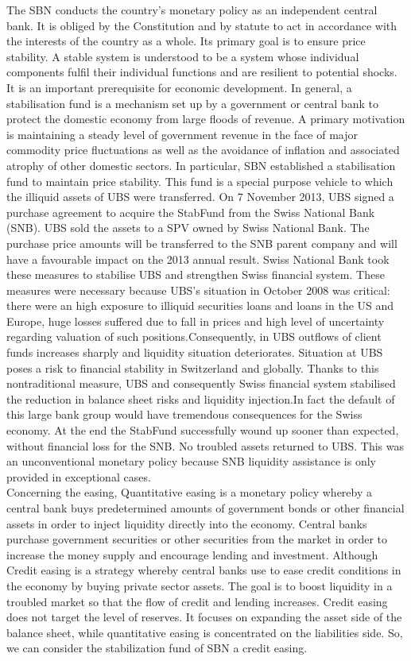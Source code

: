 \documentclass[	11pt, ]{fphw}
\begin{document}
The SBN conducts the country’s monetary policy as an independent central bank. It is obliged by the Constitution and by statute to act in accordance with the interests of the country as a whole. Its primary goal is to ensure price stability. A stable system is understood to be a system whose individual components fulfil their individual functions and are resilient to potential shocks. It is an important prerequisite for economic development.
In general, a stabilisation fund is a mechanism set up by a government or central bank to protect the domestic economy from large floods of revenue. A primary motivation is maintaining a steady level of government revenue in the face of major commodity price fluctuations as well as the avoidance of inflation and associated atrophy of other domestic sectors. 
In particular, SBN established a stabilisation fund to maintain price stability. This fund is a special purpose vehicle to which the illiquid assets of UBS were transferred. On 7 November 2013, UBS signed a purchase agreement to acquire the StabFund from the Swiss National Bank (SNB). UBS sold the assets to a SPV
owned by Swiss National Bank. The purchase price amounts will be transferred to the SNB parent company and will have a favourable impact on the 2013 annual result. Swiss National Bank took these measures to stabilise UBS and strengthen Swiss financial system. 
These measures were necessary because UBS’s situation in October 2008 was critical: there were an high exposure to illiquid securities loans and loans in the US and Europe, huge losses suffered due to fall in prices and high level of uncertainty regarding valuation of such positions.Consequently, in UBS outflows of client funds increases sharply and liquidity situation deteriorates. Situation at UBS poses a risk to financial stability in Switzerland and globally.
Thanks to this nontraditional measure, UBS and consequently Swiss financial system stabilised the reduction in balance sheet risks and liquidity injection.In fact the default of this large bank group would have tremendous consequences for the Swiss economy.
At the end the StabFund successfully wound up sooner than expected, without financial loss for the SNB. No troubled assets returned to UBS. This was an unconventional monetary policy because SNB liquidity assistance is only provided in exceptional cases.\\
Concerning the easing, Quantitative easing is a monetary policy whereby a central bank buys predetermined amounts of government bonds or other financial assets in order to inject liquidity directly into the economy. Central banks purchase government securities or other securities from the market in order to increase the money supply and encourage lending and investment. Although Credit easing is a strategy whereby central banks use to ease credit conditions in the economy by buying private sector assets. The goal is to boost liquidity in a troubled market so that the flow of credit and lending increases. Credit easing does not target the level of reserves. It focuses on expanding the asset side of the balance sheet, while quantitative easing is concentrated on the liabilities side. So, we can consider the stabilization fund of SBN a credit easing. 
\end{document}
